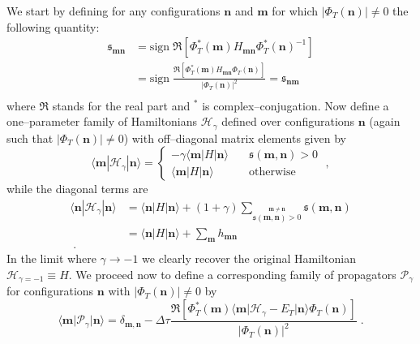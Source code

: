 We start by defining for any configurations $\mathbf{n}$ and $\mathbf{m}$ for which $|\Phi_T(\mathbf{n})| \neq 0$ the following quantity:
\begin{equation}
\begin{split}
\label{CCDMC:ham_sign}
\mathfrak{s}_{\mathbf{m}\mathbf{n}} &= \mbox{sign}\; \Re \left [ \Phi_T^*(\mathbf{m}) H_{\mathbf{m}\mathbf{n}} \Phi_T^*(\mathbf{n})^{-1}\right ]  \\
 &= \mbox{sign} \; \frac{\Re \left [ \Phi_T^*(\mathbf{m}) H_{\mathbf{m}\mathbf{n}} \Phi_T(\mathbf{n})\right ]}{ \lvert \Phi_T (\mathbf{n}) \rvert ^2} = \mathfrak{s}_{\mathbf{n}\mathbf{m}}\\
 \end{split}
\end{equation}
where $\Re$ stands for the real part and $^*$ is complex--conjugation. Now define a one--parameter family of Hamiltonians $\mathcal{H}_{\gamma}$ defined over configurations $\mathbf{n}$ (again such that
$|\Phi_T(\mathbf{n})| \neq 0$) with off--diagonal matrix elements given by
\begin{equation}
  \label{mh1}
  \langle \mathbf{m} | \mathcal{H}_{\gamma} | \mathbf{n} \rangle  =\left \{ \begin{array}{rl} -\gamma \langle \mathbf{m} | H | \mathbf{n} \rangle&  \quad    \mathfrak{s}(\mathbf{m},\mathbf{n})  > 0 \\
  \langle \mathbf{m} | H | \mathbf{n} \rangle&   \quad  \text{otherwise} \end{array} \right . \;,
\end{equation}
while the diagonal terms are
\begin{equation}
\begin{split}
\label{mh2}
\langle \mathbf{n} | \mathcal{H}_{\gamma} | \mathbf{n} \rangle &= \langle \mathbf{n} | H | \mathbf{n} \rangle+ (1+\gamma) \displaystyle \sum_{\stackrel{ \mathbf{m} \neq
\mathbf{n}}{\mathfrak{s}(\mathbf{m},\mathbf{n}) > 0}} \mathfrak{s} (\mathbf{m},\mathbf{n})\\
&= \langle \mathbf{n} | H | \mathbf{n} \rangle + \sum_{\mathbf{m}} h_{\mathbf{m}\mathbf{n}}\\\;.
\end{split}
\end{equation}
In the limit where $\gamma\to-1$ we clearly recover the original Hamiltonian $\mathcal{H}_{\gamma = -1} \equiv H$. We proceed now to define a corresponding family of propagators 
$\mathcal{P}_{\gamma}$ for configurations $\mathbf{n}$ with $|\Phi_T(\mathbf{n})| \neq 0$ by
\begin{equation}
\label{eq:CIMC_IS_prop}
\langle \mathbf{m} \lvert \mathcal{P}_{\gamma} \rvert \mathbf{n} \rangle = \delta_{\mathbf{m},\mathbf{n}} - \Delta\tau \frac{\Re \left[ \Phi^*_T(\mathbf{m}) \langle \mathbf{m} \lvert \mathcal{H}_{\gamma} - E_T \rvert \mathbf{n} \rangle \Phi_T(\mathbf{n}) \right]}{\lvert \Phi_T(\mathbf{n}) \rvert^2}\; .
\end{equation}
